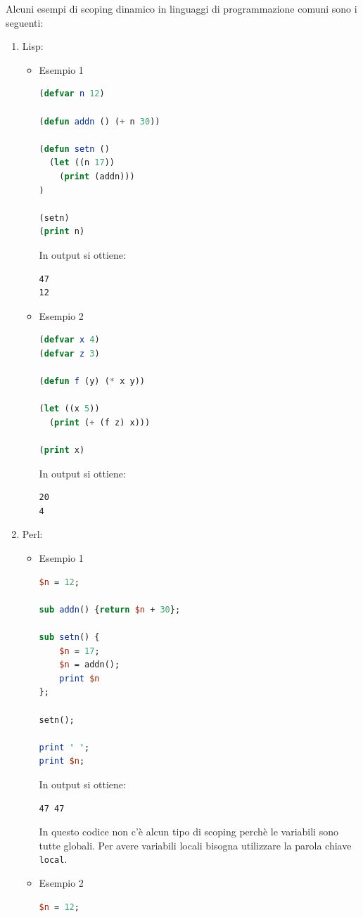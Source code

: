 \documentclass[a4paper]{article}
\begin{document}
\begin{Example}{}{}
  Alcuni esempi di scoping dinamico in linguaggi di programmazione comuni sono i seguenti:
  \begin{enumerate}
    \item Lisp:
      \begin{itemize}
        \item Esempio 1
\begin{lstlisting}[language=Lisp]
(defvar n 12)

(defun addn () (+ n 30))

(defun setn () 
  (let ((n 17))
    (print (addn)))
)

(setn)
(print n)
\end{lstlisting}
          In output si ottiene:
\begin{lstlisting}
47
12
\end{lstlisting}

        \item Esempio 2
\begin{lstlisting}[language=Lisp]
(defvar x 4)
(defvar z 3)

(defun f (y) (* x y))

(let ((x 5))
  (print (+ (f z) x)))

(print x)
\end{lstlisting}
          In output si ottiene:
\begin{lstlisting}
20
4
\end{lstlisting}
      \end{itemize}

    \item Perl:
      \begin{itemize}
        \item Esempio 1
\begin{lstlisting}[language=Perl]
$n = 12;

sub addn() {return $n + 30};

sub setn() {
    $n = 17;
    $n = addn();
    print $n
};

setn();

print ' ';
print $n;
\end{lstlisting}
    In output si ottiene:
\begin{lstlisting}
47 47
\end{lstlisting}
          In questo codice non c'è alcun tipo di scoping perchè le variabili sono tutte globali.
          Per avere variabili locali bisogna utilizzare la parola chiave \texttt{local}.

        \item Esempio 2
\begin{lstlisting}[language=Perl]
$n = 12;


\end{lstlisting}
\end{itemize}
\end{enumerate}
\end{Example}
\end{document}
